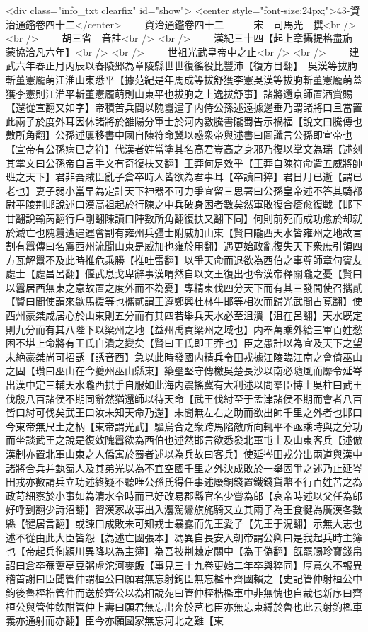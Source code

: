 <div class="info_txt clearfix" id="show">
<center style="font-size:24px;">43-資治通鑑卷四十二</center>
  　　資治通鑑卷四十二　　　宋　司馬光　撰<br />
<br />
　　胡三省　音註<br />
<br />
　　漢紀三十四【起上章攝提格盡旃蒙協洽凡六年】<br />
<br />
　　世祖光武皇帝中之止<br />
<br />
　　建武六年春正月丙辰以舂陵郷為章陵縣世世復徭役比豐沛【復方目翻】　吳漢等拔胊斬董憲龎萌江淮山東悉平【據范紀是年馬成等拔舒獲李憲吳漢等拔朐斬董憲龐萌蓋獲李憲則江淮平斬董憲龎萌則山東平也拔胊之上逸拔舒事】諸將還京師置酒賞賜【還從宣翻又如字】帝積苦兵間以隗囂遣子内侍公孫述遠據邊垂乃謂諸將曰且當置此兩子於度外耳因休諸將於雒陽分軍士於河内數騰書隴蜀告示禍福【說文曰騰傳也數所角翻】公孫述屢移書中國自陳符命冀以惑衆帝與述書曰圖讖言公孫即宣帝也【宣帝有公孫病已之符】代漢者姓當塗其名高君豈高之身邪乃復以掌文為瑞【述刻其掌文曰公孫帝自言手文有奇復扶又翻】王莽何足效乎【王莽自陳符命遣五威將帥班之天下】君非吾賊臣亂子倉卒時人皆欲為君事耳【卒讀曰猝】君日月已逝【謂已老也】妻子弱小當早為定計天下神器不可力爭宜留三思署曰公孫皇帝述不答其騎都尉平陵荆邯說述曰漢高祖起於行陳之中兵破身困者數矣然軍敗復合瘡愈復戰【邯下甘翻說輸芮翻行戶剛翻陳讀曰陣數所角翻復扶又翻下同】何則前死而成功愈於却就於滅亡也隗囂遭遇運會割有雍州兵彊士附威加山東【賢曰隴西天水皆雍州之地故言割有囂傳曰名震西州流聞山東是威加也雍於用翻】遇更始政亂復失天下衆庶引領四方瓦解囂不及此時推危乘勝【推吐雷翻】以爭天命而退欲為西伯之事尊師章句賓友處士【處昌呂翻】偃武息戈卑辭事漢喟然自以文王復出也令漢帝釋關隴之憂【賢曰以囂居西無東之意故置之度外而不為憂】專精東伐四分天下而有其三發間使召攜貳【賢曰間使謂來歙馬援等也攜貳謂王遵鄭興杜林牛邯等相次而歸光武間古莧翻】使西州豪桀咸居心於山東則五分而有其四若舉兵天水必至沮潰【沮在呂翻】天水旣定則九分而有其八陛下以梁州之地【益州禹貢梁州之域也】内奉萬乘外給三軍百姓愁困不堪上命將有王氏自潰之變矣【賢曰王氏即王莽也】臣之愚計以為宜及天下之望未絶豪桀尚可招誘【誘音酉】急以此時發國内精兵令田戎據江陵臨江南之會倚巫山之固【瓚曰巫山在今夔州巫山縣東】築壘堅守傳檄吳楚長沙以南必隨風而靡令延岑出漢中定三輔天水隴西拱手自服如此海内震搖冀有大利述以問羣臣博士吳柱曰武王伐殷八百諸侯不期同辭然猶還師以待天命【武王伐紂至于孟津諸侯不期而會者八百皆曰紂可伐矣武王曰汝未知天命乃還】未聞無左右之助而欲出師千里之外者也邯曰今東帝無尺土之柄【東帝謂光武】驅烏合之衆跨馬陷敵所向輒平不亟乘時與之分功而坐談武王之說是復效隗囂欲為西伯也述然邯言欲悉發北軍屯士及山東客兵【述倣漢制亦置北軍山東之人僑寓於蜀者述以為兵故曰客兵】使延岑田戎分出兩道與漢中諸將合兵并埶蜀人及其弟光以為不宜空國千里之外決成敗於一舉固爭之述乃止延岑田戎亦數請兵立功述終疑不聽唯公孫氏得任事述廢銅錢置鐵錢貨幣不行百姓苦之為政苛細察於小事如為清水令時而已好改易郡縣官名少嘗為郎【哀帝時述以父任為郎好呼到翻少詩沼翻】習漢家故事出入灋駕鸞旗旄騎又立其兩子為王食犍為廣漢各數縣【犍居言翻】或諫曰成敗未可知戎士暴露而先王愛子【先王于況翻】示無大志也述不從由此大臣皆怨【為述亡國張本】馮異自長安入朝帝謂公卿曰是我起兵時主簿也【帝起兵徇潁川異降以為主簿】為吾披荆棘定關中【為于偽翻】旣罷賜珍寶錢帛詔曰倉卒蕪蔞亭豆粥虖沱河麥飯【事見三十九卷更始二年卒與猝同】厚意久不報異稽首謝曰臣聞管仲謂桓公曰願君無忘射鉤臣無忘檻車齊國賴之【史記管仲射桓公中鉤後魯桎梏管仲而送於齊公以為相說苑曰管仲桎梏檻車中非無愧也自裁也新序曰齊桓公與管仲飲酣管仲上夀曰願君無忘出奔於莒也臣亦無忘束縛於魯也此云射鉤檻車義亦通射而亦翻】臣今亦願國家無忘河北之難【東